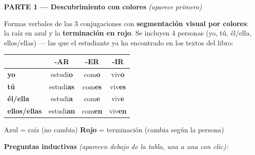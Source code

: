 \documentclass[a4paper,10pt]{article}
\renewcommand{\arraystretch}{1.3}
\newcommand{\raiz}[1]{\textcolor{azulraiz}{#1}}
\newcommand{\termin}[1]{\textcolor{rojofinal}{\textbf{#1}}}
\begin{document}
\vspace{0.4cm}


\noindent\textcolor{azulprincipal}{\textbf{\large PARTE 1 — Descubrimiento con colores}} {\small\textit{(aparece primero)}}

\vspace{0.3cm}

Formas verbales de las 3 conjugaciones con \textbf{segmentación visual por colores}: la \raiz{raíz en azul} y la \termin{terminación en rojo}. Se incluyen 4 personas (yo, tú, él/ella, ellos/ellas) — las que el estudiante ya ha encontrado en los textos del libro:

\vspace{0.3cm}

\begin{center}
\renewcommand{\arraystretch}{1.8}
\begin{tabular}{|>{\bfseries}l|c|c|c|}
\hline
\rowcolor{azulprincipal!15}
& \textbf{-AR} & \textbf{-ER} & \textbf{-IR} \\
\hline
yo & \raiz{estudi}\termin{o} & \raiz{com}\termin{o} & \raiz{viv}\termin{o} \\
\hline
\rowcolor{gris}
tú & \raiz{estudi}\termin{as} & \raiz{com}\termin{es} & \raiz{viv}\termin{es} \\
\hline
él/ella & \raiz{estudi}\termin{a} & \raiz{com}\termin{e} & \raiz{viv}\termin{e} \\
\hline
\rowcolor{gris}
ellos/ellas & \raiz{estudi}\termin{an} & \raiz{com}\termin{en} & \raiz{viv}\termin{en} \\
\hline
\end{tabular}
\end{center}

\vspace{0.3cm}

{\small \raiz{Azul} = raíz (no cambia) \hspace{1.5cm} \termin{Rojo} = terminación (cambia según la persona)}

\vspace{0.4cm}

\noindent\textcolor{azulprincipal}{\textbf{Preguntas inductivas}} {\small\textit{(aparecen debajo de la tabla, una a una con clic):}}

\vspace{0.2cm}
\end{document}
